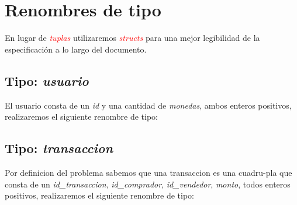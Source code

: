 \documentclass[10pt,a4paper]{article}
\begin{document}
    \maketitle

    \section{Renombres de tipo}
    En lugar de \textcolor{red}{\textit{tuplas}} utilizaremos \textcolor{red}{\textit{structs}} para una mejor legibilidad de la especificación a lo largo del documento.

    \subsection{Tipo: \textit{usuario}}
    El usuario consta de un \textit{id} y una cantidad de \textit{monedas}, ambos enteros positivos, realizaremos el siguiente renombre de tipo:

    \vspace{0.3cm}
    \noindent
    \vspace{0.1cm}

    \subsection{Tipo: \textit{transaccion}}
    Por definicion del problema sabemos que una transaccion es una cuadru-pla que consta de un \textit{id\_transaccion}, \textit{id\_comprador}, \textit{id\_vendedor}, \textit{monto}, todos enteros positivos, realizaremos el siguiente renombre de tipo:

    \vspace{0.3cm}
    \noindent
    \vspace{0.1cm}
\end{document}
